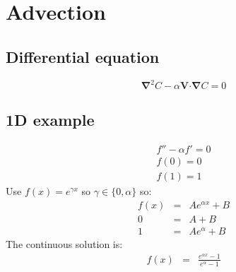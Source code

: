 \documentclass[11pt]{article}
\providecommand\bnabla{\boldsymbol{\nabla}}
\providecommand\bcdot{\boldsymbol{\cdot}}
\begin{document}
\section{Advection}
\subsection{Differential equation}
\begin{equation}
	\bnabla^2 C - \alpha \mathbf{V} \bcdot \bnabla C = 0	
\end{equation}

\subsection{1D example}
\begin{eqnarray}
  f'' - \alpha f' = 0 \\
  f(0) = 0 \\ f(1) = 1
\end{eqnarray}
Use $f(x) = e^{\gamma x}$ so $\gamma \in \{0, \alpha\}$ so:
\begin{eqnarray}
  f(x) &=& Ae^{\alpha x} + B \\
  0 &=& A + B \\
  1 &=& Ae^{\alpha} + B
\end{eqnarray}
The continuous solution is:
\begin{eqnarray}
  f(x) &=& \frac{e^{\alpha x} - 1}{e^{\alpha} - 1}
\end{eqnarray}
\end{document}
